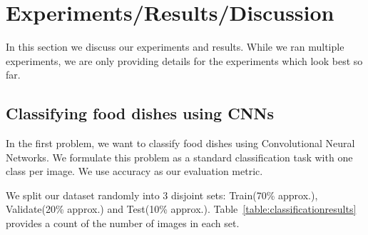 \section{Experiments/Results/Discussion}

%
%

In this section we discuss our experiments and results. While we ran multiple experiments, we are only providing details for the experiments which look best so far.

\subsection{Classifying food dishes using CNNs}

In the first problem, we want to classify food dishes using Convolutional Neural Networks. We formulate this problem as a standard classification task with one class per image. We use accuracy as our evaluation metric.

We split our dataset randomly into 3 disjoint sets: Train(70\% approx.), Validate(20\% approx.) and Test(10\% approx.). Table~\ref{table:classificationresults} provides a count of the number of images in each set.

